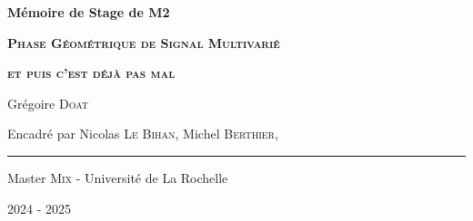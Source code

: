 





	
	


\begin{titlepage}
	
	\centering
	\vspace{1.5cm}
	{\huge\textbf{Mémoire de Stage de M2}}\par
	
	\vspace{2cm}
	{\huge\textbf{\textsc{Phase Géométrique de Signal Multivarié}}}\par 
	\vspace{0.5cm}
	
	{\huge\textbf{\textsc{et puis c'est déjà pas mal}}}\par
	\vspace{2.0cm}
	
	{\large Grégoire \textsc{Doat}}\par
	\vspace{0.5cm}
	\vfill
	
	{\large Encadré par Nicolas \textsc{Le Bihan},  Michel \textsc{Berthier}, \etal}\par
	\vspace{0.5cm}
	
	\rule{10cm}{0.4pt}\par
	\vspace{0.7cm}
	
	{Master \textsc{Mix} - Université de La Rochelle}\par
	\vspace{0.25cm}
	
	{\large 2024 - 2025}
\end{titlepage}



\newpage

\tableofcontents
\thispagestyle{empty}




\newpage

